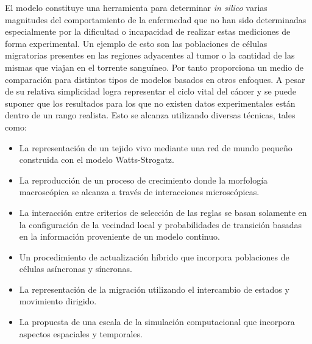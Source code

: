 El modelo constituye una herramienta para determinar \emph{in silico} varias magnitudes del comportamiento de la enfermedad que no han sido determinadas especialmente por la dificultad o incapacidad de realizar estas mediciones de forma experimental. Un ejemplo de esto son las poblaciones de c\'elulas migratorias presentes en las regiones adyacentes al tumor o la cantidad de las mismas que viajan en el torrente sangu\'ineo. Por tanto proporciona un medio de comparaci\'on para distintos tipos de modelos basados en otros enfoques. A pesar de su relativa simplicidad logra representar el ciclo vital del c\'ancer y se puede suponer que los resultados para los que no existen datos experimentales est\'an dentro de un rango realista. Esto se alcanza utilizando diversas t\'ecnicas, tales como:

\begin{itemize}
\item La representaci\'on de un tejido vivo mediante una red de mundo peque\~no construida con el modelo Watts-Strogatz.

\item La reproducci\'on de un proceso de crecimiento donde la morfolog\'ia macrosc\'opica se alcanza a trav\'es de interacciones microsc\'opicas.

\item La interacci\'on entre criterios de selecci\'on de las reglas se basan solamente en la configuraci\'on de la vecindad local y probabilidades de transici\'on basadas en la informaci\'on proveniente de un modelo continuo. 

\item Un procedimiento de actualizaci\'on h\'ibrido que incorpora poblaciones de c\'elulas as\'incronas y s\'incronas.
\item La representaci\'on de la migraci\'on utilizando el intercambio de estados y movimiento dirigido.

\item La propuesta de una escala de la simulaci\'on computacional que incorpora aspectos espaciales y temporales.
\end{itemize}

